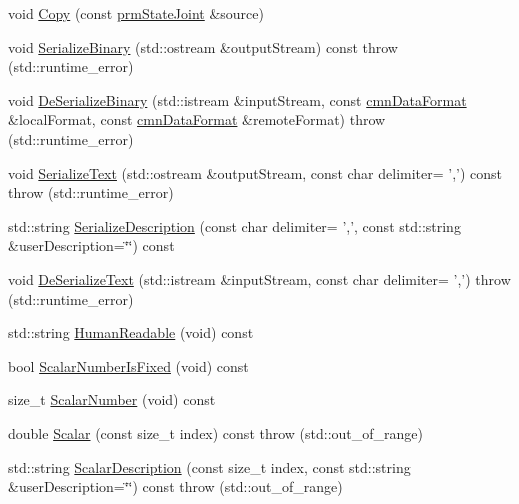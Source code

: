 \begin{DoxyCompactItemize}
\item 
void \hyperlink{classprm_state_joint_a1770920c4f956ea675f98dc2867503d9}{Copy} (const \hyperlink{classprm_state_joint}{prm\-State\-Joint} \&source)
\item 
void \hyperlink{classprm_state_joint_af1606817e7ebd072dbe695c874ce0f7d}{Serialize\-Binary} (std\-::ostream \&output\-Stream) const   throw (std\-::runtime\-\_\-error)
\item 
void \hyperlink{classprm_state_joint_a31059fd8a3a2d705bfa7754a337c07fc}{De\-Serialize\-Binary} (std\-::istream \&input\-Stream, const \hyperlink{classcmn_data_format}{cmn\-Data\-Format} \&local\-Format, const \hyperlink{classcmn_data_format}{cmn\-Data\-Format} \&remote\-Format)  throw (std\-::runtime\-\_\-error)
\item 
void \hyperlink{classprm_state_joint_a6e22d4aa0ce79f39ecaf3c0c0f77425f}{Serialize\-Text} (std\-::ostream \&output\-Stream, const char delimiter= ',') const   throw (std\-::runtime\-\_\-error)
\item 
std\-::string \hyperlink{classprm_state_joint_a44f6aa3cbbb14cb3761247525de4c83d}{Serialize\-Description} (const char delimiter= ',', const std\-::string \&user\-Description=\char`\"{}\char`\"{}) const 
\item 
void \hyperlink{classprm_state_joint_a9bdcfcfa22f8b7d45f3807c97b9fbca0}{De\-Serialize\-Text} (std\-::istream \&input\-Stream, const char delimiter= ',')  throw (std\-::runtime\-\_\-error)
\item 
std\-::string \hyperlink{classprm_state_joint_a3157052f77bffa00c499f081ec9766e8}{Human\-Readable} (void) const 
\item 
bool \hyperlink{classprm_state_joint_a4d5825242316a3458fe9319168410cd6}{Scalar\-Number\-Is\-Fixed} (void) const 
\item 
size\-\_\-t \hyperlink{classprm_state_joint_a7e9e67502153af98937254fc18fe745e}{Scalar\-Number} (void) const 
\item 
double \hyperlink{classprm_state_joint_a5ccf6ed274c92d2e5e16475d8b32668f}{Scalar} (const size\-\_\-t index) const   throw (std\-::out\-\_\-of\-\_\-range)
\item 
std\-::string \hyperlink{classprm_state_joint_a9933b1ce064736f559c77004146512da}{Scalar\-Description} (const size\-\_\-t index, const std\-::string \&user\-Description=\char`\"{}\char`\"{}) const   throw (std\-::out\-\_\-of\-\_\-range)
\end{DoxyCompactItemize}
